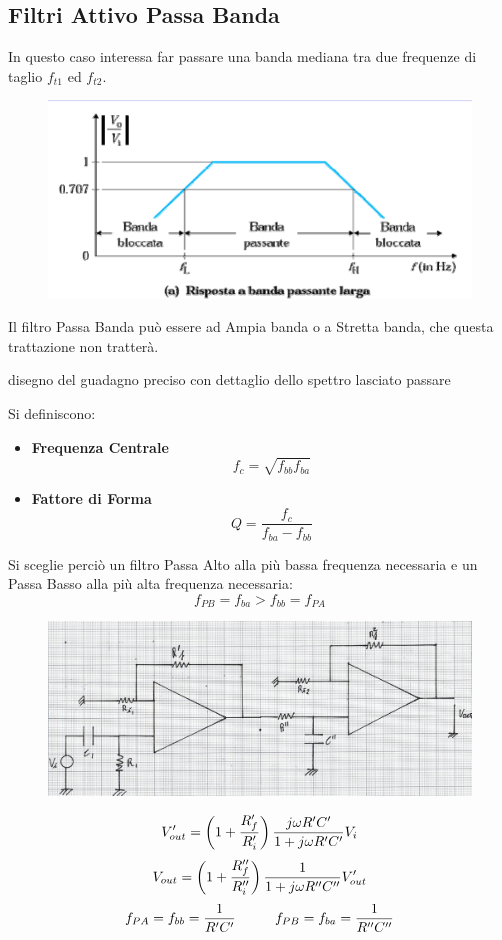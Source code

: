 \documentclass[a4paper, 15pt]{article}
\begin{document}
\subsection{Filtri Attivo Passa Banda}
\begin{adjustwidth}{2in}{}
   		In questo caso interessa far passare una banda mediana tra due frequenze di taglio $f_{t1}$ ed $f_{t2}$.   		
   		\begin{figure}[H]
   			\centering
   			\includegraphics[width=0.5\linewidth]{immagini/screenshot004}
   			\label{fig:screenshot004}
   		\end{figure}   		  		
   		Il filtro Passa Banda può essere ad Ampia banda o a Stretta banda, che questa trattazione non tratterà. 
   		
   		disegno del guadagno preciso con dettaglio dello spettro lasciato passare
   		
   		Si definiscono: 
   		\begin{itemize}
   			\item \textbf{Frequenza Centrale} 
   			\[f_c = \sqrt{f_{bb}f_{ba}}\]
   			\item \textbf{Fattore di Forma}
   			\[Q = \dfrac{f_c}{f_{ba}-f_{bb}}\]
   		\end{itemize}
   	
   		Si sceglie perciò un filtro Passa Alto alla più bassa frequenza necessaria e un Passa Basso alla più alta frequenza necessaria:
   		\[f_{PB} = f_{ba} > f_{bb} = f_{PA}\]   		
   		\begin{figure}[H]
   			\centering
   			\includegraphics[width=0.5\linewidth]{immagini/mm(22)}
   			\label{fig:mm22}
   		\end{figure}   	  		
   		\[V_{out}' = \left(1+{R_f'\over R_i'}\right){j\omega R'C'\over 1+j\omega R'C'}V_i \]
   		\[V_{out} = \left(1+{R_f''\over R_i''}\right)\dfrac{1}{1+j\omega R''C''}V_{out}' \]
   		\[f_{PA} = f_{bb} = {1\over R'C'} \hspace{1cm} f_{PB} = f_{ba} = {1\over R''C''}\]
\end{adjustwidth}
\newpage
\end{document}
